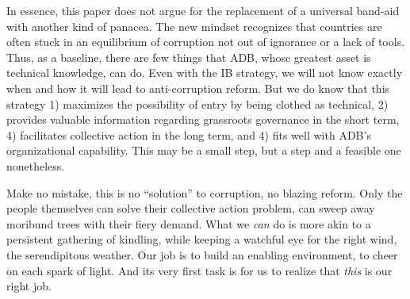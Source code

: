 \documentclass[12pt]{article}
\begin{document}
In essence, this paper does not argue for the replacement of a universal band-aid with another kind of panacea.  The new mindset recognizes that countries are often stuck in an equilibrium of corruption not out of ignorance or a lack of tools. Thus, as a baseline, there are few things that ADB, whose greatest asset is technical knowledge, can do. Even with the IB strategy, we will not know exactly when and how it will lead to anti-corruption reform. But we do know that this strategy 1) maximizes the possibility of entry by being clothed as technical, 2) provides valuable information regarding grassroots governance in the short term, 4) facilitates collective action in the long term, and 4) fits well with ADB's organizational capability. This may be a small step, but a step and a feasible one nonetheless.

Make no mistake, this is no ``solution'' to corruption, no blazing reform. Only the people themselves can solve their collective action problem, can sweep away moribund trees with their fiery demand. What we \textit{can} do is more akin to a persistent gathering of kindling, while keeping a watchful eye for the right wind, the serendipitous weather. Our job is to build an enabling environment, to cheer on each spark of light. And its very first task is for us to realize that \textit{this} is our right job.

\newpage


\end{document}
